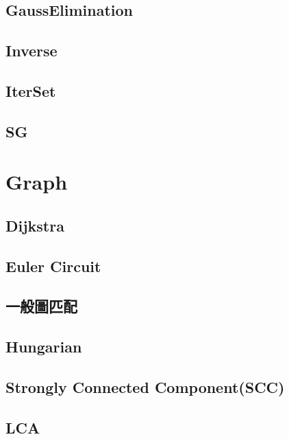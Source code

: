 \subsection{GaussElimination}

\subsection{Inverse}

\subsection{IterSet}

\subsection{SG}


\section{Graph}

\subsection{Dijkstra}

%
\subsection{Euler Circuit}

\subsection{一般圖匹配}

\subsection{Hungarian}

\subsection{Strongly Connected Component(SCC)}

\subsection{LCA}

